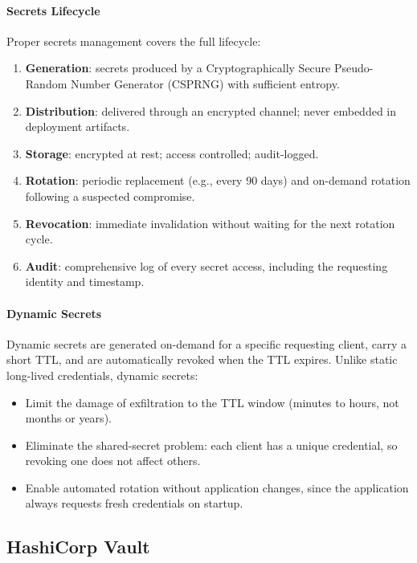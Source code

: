 \paragraph{Secrets Lifecycle}

Proper secrets management covers the full lifecycle:
\begin{enumerate}
    \item \textbf{Generation}: secrets produced by a Cryptographically Secure Pseudo-Random Number Generator (CSPRNG) with sufficient entropy.
    \item \textbf{Distribution}: delivered through an encrypted channel; never embedded in deployment artifacts.
    \item \textbf{Storage}: encrypted at rest; access controlled; audit-logged.
    \item \textbf{Rotation}: periodic replacement (e.g., every 90 days) and on-demand rotation following a suspected compromise.
    \item \textbf{Revocation}: immediate invalidation without waiting for the next rotation cycle.
    \item \textbf{Audit}: comprehensive log of every secret access, including the requesting identity and timestamp.
\end{enumerate}

\paragraph{Dynamic Secrets}

Dynamic secrets are generated on-demand for a specific requesting client, carry a short TTL, and are automatically revoked when the TTL expires. Unlike static long-lived credentials, dynamic secrets:
\begin{itemize}
    \item Limit the damage of exfiltration to the TTL window (minutes to hours, not months or years).
    \item Eliminate the shared-secret problem: each client has a unique credential, so revoking one does not affect others.
    \item Enable automated rotation without application changes, since the application always requests fresh credentials on startup.
\end{itemize}

\subsection{HashiCorp Vault}

